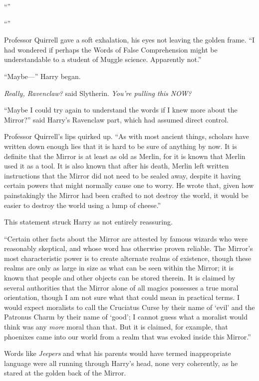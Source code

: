 “”

“”

Professor Quirrell gave a soft exhalation, his eyes not leaving the golden frame. “I had wondered if perhaps the Words of False Comprehension might be understandable to a student of Muggle science. Apparently not.”

“Maybe—” Harry began.

\emph{Really, Ravenclaw?} said Slytherin. \emph{You’re pulling this NOW?}

“Maybe I could try again to understand the words if I knew more about the Mirror?” said Harry’s Ravenclaw part, which had assumed direct control.

Professor Quirrell’s lips quirked up. “As with most ancient things, scholars have written down enough lies that it is hard to be sure of anything by now. It is definite that the Mirror is at least as old as Merlin, for it is known that Merlin used it as a tool. It is also known that after his death, Merlin left written instructions that the Mirror did not need to be sealed away, despite it having certain powers that might normally cause one to worry. He wrote that, given how painstakingly the Mirror had been crafted to not destroy the world, it would be easier to destroy the world using a lump of cheese.”

This statement struck Harry as not entirely reassuring.

“Certain other facts about the Mirror are attested by famous wizards who were reasonably skeptical, and whose word has otherwise proven reliable. The Mirror’s most characteristic power is to create alternate realms of existence, though these realms are only as large in size as what can be seen within the Mirror; it is known that people and other objects can be stored therein. It is claimed by several authorities that the Mirror alone of all magics possesses a true moral orientation, though I am not sure what that could mean in practical terms. I would expect moralists to call the Cruciatus Curse by their name of ‘evil’ and the Patronus Charm by their name of ‘good’; I cannot guess what a moralist would think was any \emph{more} moral than that. But it is claimed, for example, that phoenixes came into our world from a realm that was evoked inside this Mirror.”



Words like \emph{Jeepers} and what his parents would have termed inappropriate language were all running through Harry’s head, none very coherently, as he stared at the golden back of the Mirror.

